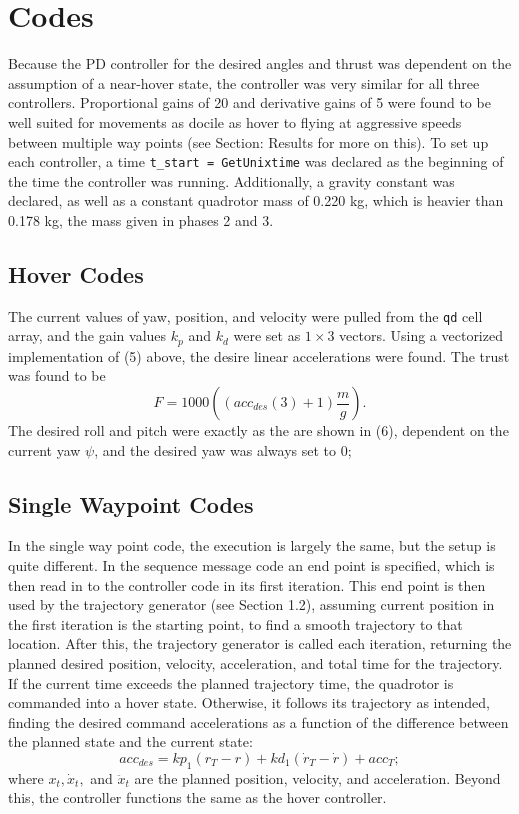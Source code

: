 \section{Codes}

Because the PD controller for the desired angles and thrust was dependent on the assumption of a near-hover state, the controller was very similar for all three controllers. 
Proportional gains of 20 and derivative gains of 5 were found to be well suited for movements as docile as hover to flying at aggressive speeds between multiple way points (see Section: Results for more on this).  
To set up each controller, a time \verb!t_start = GetUnixtime! was declared as the beginning of the time the controller was running. Additionally, a gravity constant was declared, as well as a constant quadrotor mass of 0.220 kg, which is heavier than 0.178 kg, the mass given in phases 2 and 3. 

\subsection{Hover Codes}

The current values  of yaw, position, and velocity were pulled from the \verb!qd! cell array, and the gain values $k_p$ and $k_d$ were set as $1 \times 3$ vectors. Using a vectorized implementation of (5) above, the desire linear accelerations were found. The trust was found to be  
\begin{equation*}
F = 1000((acc_{des}(3)+1) \frac{m}{g}).
\end{equation*}
The desired roll and pitch were exactly as the are shown in (6), dependent on the current yaw $\psi$,  and the desired yaw was always set to 0; 


\subsection{Single Waypoint Codes}

In the single way point code, the execution is largely the same, but the setup is quite different. In the sequence message code an end point is specified, which is then read in to the controller code in its first iteration. This end point is then used by the trajectory generator (see Section 1.2), assuming current position in the first iteration is the starting point, to find a smooth trajectory to that location. 
After this, the trajectory generator is called each iteration, returning the planned desired position, velocity, acceleration, and total time for the trajectory. If the current time exceeds the planned trajectory time, the quadrotor is commanded into a hover state. Otherwise, it follows its trajectory as intended, finding the desired command accelerations as a function of the difference between the planned state and the current state:
\begin{equation*}
acc_{des} = kp_1 (r_T- r) + kd_1(\dot r_T -\dot r)  + acc_T;
\end{equation*}
where $x_t, \dot x_t,$ and $\ddot x_t$ are the planned position, velocity, and acceleration. Beyond this, the controller functions the same as the hover controller.

